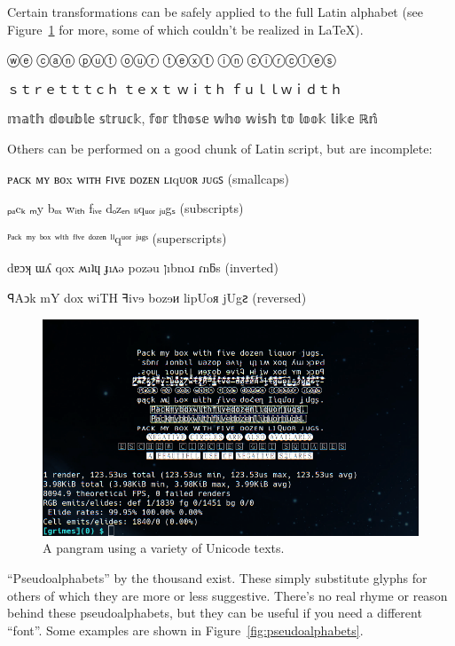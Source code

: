 Certain transformations can be safely applied to the full Latin alphabet
(see Figure~\ref{fig:unicodeweird} for more, some of which couldn't be
realized in \LaTeX).

\begin{denseitemize}
\item{{ⓦⓔ ⓒⓐⓝ ⓟⓤⓣ ⓞⓤⓡ ⓣⓔⓧⓣ ⓘⓝ ⓒⓘⓡⓒⓛⓔⓢ}}
\item{ｓｔｒｅｔｔｔｃｈ ｔｅｘｔ ｗｉｔｈ ｆｕｌｌｗｉｄｔｈ}
\item{{𝕞𝕒𝕥𝕙 𝕕𝕠𝕦𝕓𝕝𝕖 𝕤𝕥𝕣𝕦𝕔𝕜, 𝕗𝕠𝕣 𝕥𝕙𝕠𝕤𝕖 𝕨𝕙𝕠 𝕨𝕚𝕤𝕙 𝕥𝕠 𝕝𝕠𝕠𝕜 𝕝𝕚𝕜𝕖 ℝ\^𝕟}}
\end{denseitemize}

Others can be performed on a good chunk of Latin script, but are incomplete:

\begin{denseitemize}
\item{{ᴘᴀᴄᴋ ᴍʏ ʙᴏx ᴡɪᴛʜ ꜰɪᴠᴇ ᴅᴏᴢᴇɴ ʟɪqᴜᴏʀ ᴊᴜɢꜱ (smallcaps)}}
\item{{ₚₐcₖ ₘy bₒₓ wᵢₜₕ fᵢᵥₑ dₒzₑₙ ₗᵢqᵤₒᵣ ⱼᵤgₛ (subscripts)}}
\item{{ᴾᵃᶜᵏ ᵐʸ ᵇᵒˣ ʷⁱᵗʰ ᶠⁱᵛᵉ ᵈᵒᶻᵉⁿ ˡⁱqᵘᵒʳ ʲᵘᵍˢ (superscripts)}}
\item{{dɐɔʞ ɯʎ qox ʍıʇɥ ɟıʌǝ pozǝu ןıbnoɹ ɾnƃs (inverted)}}
\item{{ꟼAↄk mY dox wiTH ꟻivɘ bozɘᴎ lipUoᴙ jUgꙅ (reversed)}}
\end{denseitemize}

\begin{figure}[!htb]
    \centering
    \includegraphics[width=.75\linewidth]{media/unicode-weird.png}
    \caption{A pangram using a variety of Unicode texts.}
    \label{fig:unicodeweird}
\end{figure}

``Pseudoalphabets'' by the thousand exist. These simply substitute glyphs for
others of which they are more or less suggestive. There's no real rhyme or
reason behind these pseudoalphabets, but they can be useful if you need a
different ``font''. Some examples are shown in Figure~\ref{fig:pseudoalphabets}.

